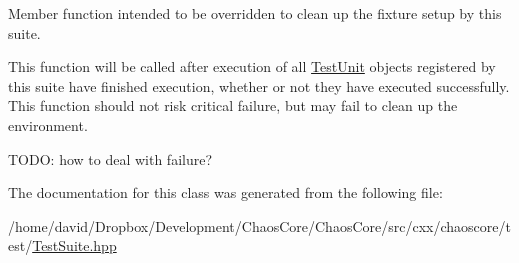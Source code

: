 Member function intended to be overridden to clean up the fixture setup by this suite. 

This function will be called after execution of all \hyperlink{classchaos_1_1test_1_1_test_unit}{Test\-Unit} objects registered by this suite have finished execution, whether or not they have executed successfully. This function should not risk critical failure, but may fail to clean up the environment.

T\-O\-D\-O\-: how to deal with failure? 

The documentation for this class was generated from the following file\-:\begin{DoxyCompactItemize}
\item 
/home/david/\-Dropbox/\-Development/\-Chaos\-Core/\-Chaos\-Core/src/cxx/chaoscore/test/\hyperlink{_test_suite_8hpp}{Test\-Suite.\-hpp}\end{DoxyCompactItemize}
